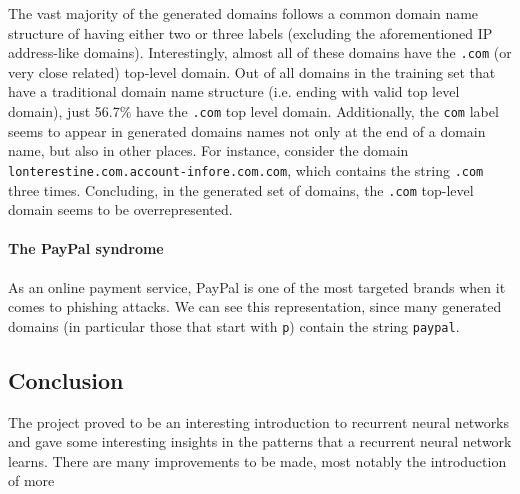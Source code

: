 The vast majority of the generated domains follows a common domain name structure of having either two or three labels (excluding the aforementioned IP address-like domains).
Interestingly, almost all of these domains have the {\tt .com} (or very close related) top-level domain.
Out of all domains in the training set that have a traditional domain name structure (i.e. ending with valid top level domain), just 56.7\% have the {\tt .com} top level domain. 
Additionally, the {\tt com} label seems to appear in generated domains names not only at the end of a domain name, but also in other places.
For instance, consider the domain {\tt lonterestine.com.account-infore.com.com}, which contains the string {\tt .com} three times.
Concluding, in the generated set of domains, the {\tt .com} top-level domain seems to be overrepresented.

\paragraph{The PayPal syndrome}
As an online payment service, PayPal is one of the most targeted brands when it comes to phishing attacks.
We can see this representation, since many generated domains (in particular those that start with {\tt p}) contain the string {\tt paypal}.

\subsection{Conclusion}
The project proved to be an interesting introduction to recurrent neural networks and gave some interesting insights in the patterns that a recurrent neural network learns.
There are many improvements to be made, most notably the introduction of more 